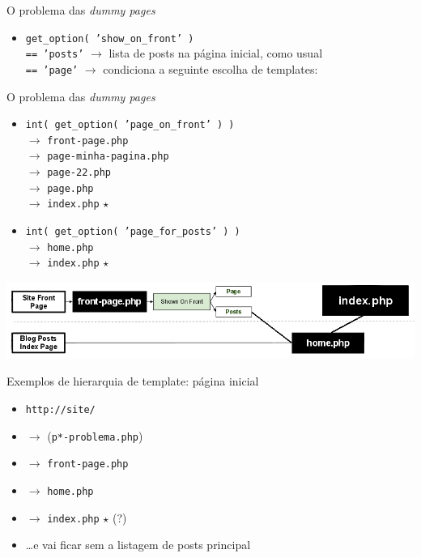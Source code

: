 \documentclass[handout]{beamer}
\begin{document}
\begin{frame}{O problema das \emph{dummy pages}}
\begin{itemize}
  \pause \item{\texttt{get\_option( 'show\_on\_front' )}} \\
    \pause \texttt{== 'posts'} $\rightarrow$ lista de posts na página inicial,
      como usual \\
    \pause \texttt{== 'page'} $\rightarrow$ condiciona a seguinte escolha de
      templates:
\end{itemize}
\end{frame}

\begin{frame}{O problema das \emph{dummy pages}}
\begin{itemize}
  \pause \item \texttt{int( get\_option( 'page\_on\_front' ) )} \\
    \pause $\rightarrow$ \texttt{front-page.php} \\
    \pause $\rightarrow$ \texttt{page-minha-pagina.php} \\
    \pause $\rightarrow$ \texttt{page-22.php} \\
    \pause $\rightarrow$ \texttt{page.php} \\
    \pause $\rightarrow$ \texttt{index.php} $\star$
  \pause \item \texttt{int( get\_option( 'page\_for\_posts' ) )} \\
    \pause $\rightarrow$ \texttt{home.php} \\
    \pause $\rightarrow$ \texttt{index.php} $\star$
\end{itemize}
\end{frame}

\begin{frame}
\begin{center}
  \includegraphics[width=\textwidth]{./img/template-hierarchy-front.png}
\end{center}
\end{frame}

\begin{frame}{Exemplos de hierarquia de template: página inicial}
\begin{itemize}
  \pause \item \texttt{http://site/}
  \pause \item $\rightarrow$ (\texttt{p*-problema.php})
  \pause \item $\rightarrow$ \texttt{front-page.php}
  \pause \item $\rightarrow$ \texttt{home.php}
  \pause \item $\rightarrow$ \texttt{index.php} $\star$ (?)
  \pause \item \ldots e vai ficar sem a listagem de posts principal
\end{itemize}
\end{frame}
\end{document}
